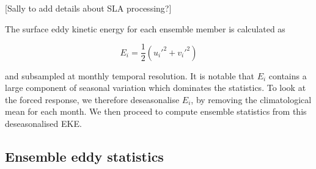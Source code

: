 \documentclass{agujournal2019}
\newcommand{\andycomment}[1]{{\color{blue} [#1]}}
\begin{document}
\andycomment{Sally to add details about SLA processing?}

The surface eddy kinetic energy for each ensemble member is calculated as 
\begin{linenomath*}
\begin{equation}
E_i = \frac{1}{2}(u_i'^2 + v_i'^2)
\end{equation}
\end{linenomath*}
and subsampled at monthly temporal resolution.
It is notable that $E_i$ contains a large component of seasonal variation \citep{Martinez-Moreno2021} which dominates the statistics.
To look at the forced response, we therefore deseasonalise $E_i$, by removing the climatological mean for each month.
We then proceed to compute ensemble statistics from this deseasonalised EKE.

\subsection{Ensemble eddy statistics}
\end{document}
